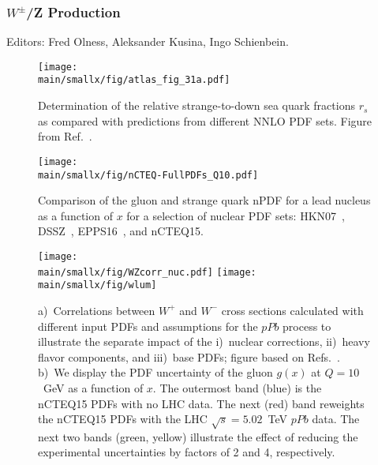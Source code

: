 \documentclass[../report.tex]{subfiles}
\providecommand{\main}{..}
\begin{document}
\subsubsection{$W^\pm$/Z Production}
Editors: Fred Olness, Aleksander Kusina, Ingo Schienbein.

\begin{figure}[tbh] %
\centering{} 
\texttt{[image: \\main/smallx/fig/atlas\_fig\_31a.pdf]}
\caption{
Determination of the relative strange-to-down sea quark fractions $r_s$ as compared with  predictions from different NNLO PDF sets. Figure from Ref.~\cite{Aaboud:2016btc}.
}
\label{fig:atlas_s}
\end{figure}

\begin{figure}[t] %
\centering{} 
\texttt{[image: \\main/smallx/fig/nCTEQ-FullPDFs\_Q10.pdf]}
\caption{
Comparison of the gluon and strange quark nPDF for a lead nucleus as a function of $x$ for 
a selection of nuclear PDF sets:
HKN07~\cite{Hirai:2004wq}, DSSZ~\cite{deFlorian:2011fp}, EPPS16~\cite{Eskola:2016oht}, and nCTEQ15\cite{Kovarik:2015cma}.
}
\label{fig:npdf}
\end{figure}


\begin{figure}[t] %
\centering{} 
\texttt{[image: \\main/smallx/fig/WZcorr\_nuc.pdf]}
\hfil
\texttt{[image: \\main/smallx/fig/wlum]}
\caption{
a)~Correlations between $W^+$ and $W^-$ cross sections calculated with different input PDFs and assumptions for the $pPb$ process to illustrate the separate impact of the 
i)~nuclear corrections, ii)~heavy flavor components, and iii)~base PDFs; 
figure based on Refs.~\cite{Kusina:2016fxy,Godat:2018kgp}.
\\\hspace{\textwidth}
b)~We display the PDF uncertainty of the gluon $g(x)$ at $Q=10$~GeV 
as a function of $x$. 
The outermost band (blue) is the nCTEQ15 PDFs with no LHC data. 
The next (red) band reweights the nCTEQ15 PDFs with the LHC $\sqrt{s}=5.02$~TeV $pPb$ data. 
The next two bands (green, yellow) illustrate the effect of reducing the experimental uncertainties 
by factors of 2 and 4, respectively.\label{fig:WZcorr}
}
\end{figure}
\end{document}
